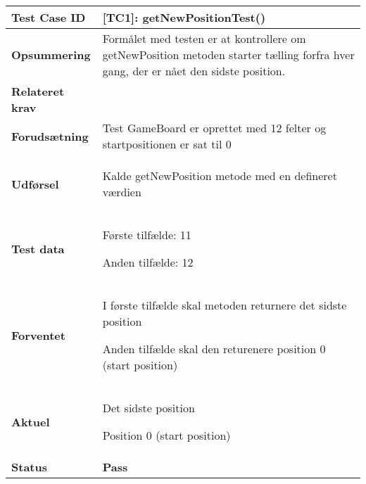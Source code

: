 \documentclass[class=article, crop=false]{standalone}
\begin{document}
    \begin{table}[H]
        \begin{tabularx}{\textwidth}{|l|X|}
            \hline
            \textbf{Test Case ID }       & \textbf{[TC1]: getNewPositionTest()}   \\ \hline
            \textbf{Opsummering}         & Formålet med testen er at kontrollere om getNewPosition
            metoden starter tælling forfra hver gang,
            der er nået den sidste position.\\ \hline
            \textbf{Relateret krav }     &      \\ \hline
            \textbf{Forudsætning}& Test GameBoard er oprettet med 12 felter og startpositionen er sat til 0\\ \hline
            \textbf{Udførsel}            & \begin{tabenum}
                                               \item Kalde getNewPosition metode med en defineret værdien
            \end{tabenum} \\ \hline
            \textbf{Test data}           & \begin{tabenum}
                                               \item Første tilfælde: 11
                                               \item Anden tilfælde: 12
            \end{tabenum}  \\ \hline
            \textbf{Forventet} & \begin{tabenum}
                                     \item I første tilfælde skal metoden returnere det sidste position
                                     \item Anden tilfælde skal den returenere position 0 (start position)
            \end{tabenum}  \\ \hline
            \textbf{Aktuel} & \begin{tabenum}
                                  \item Det sidste position
                                  \item Position 0 (start position)
            \end{tabenum}   \\ \hline
            \textbf{Status} & \textbf{Pass} \\ \hline

\end{tabularx}
\end{table}
\end{document}
